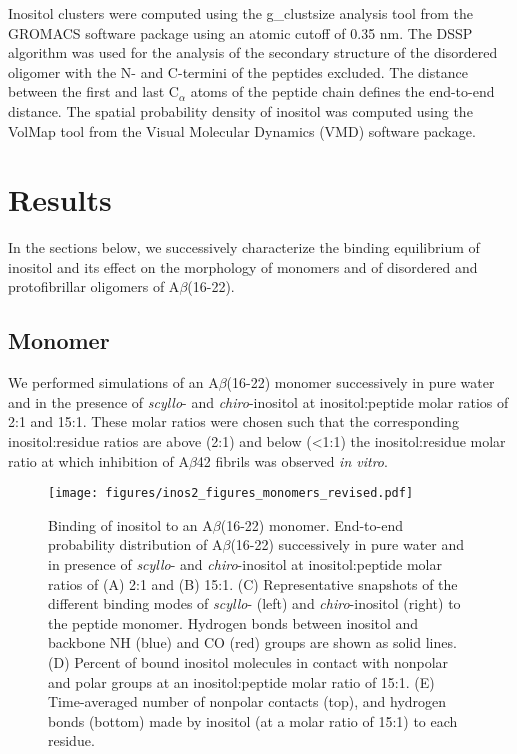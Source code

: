 Inositol clusters were computed using the g\_clustsize analysis tool from the GROMACS software package using an atomic cutoff of 0.35 nm. The DSSP algorithm was used for the analysis of the secondary structure of the disordered oligomer with the N- and C-termini of the peptides excluded. The distance between the first and last C$_{\alpha}$ atoms of the peptide chain defines the end-to-end distance. The spatial probability density of inositol was computed using the VolMap tool from the Visual Molecular Dynamics (VMD) software package.\cite{Humphrey:1996p850}

\section{Results}

In the sections below, we successively characterize the binding equilibrium of inositol and its effect on the morphology of monomers and of disordered and protofibrillar oligomers of A$\beta$(16-22).

\subsection{Monomer}

We performed simulations of an A$\beta$(16-22) monomer successively in pure water and in the presence of \emph{scyllo}- and \emph{chiro}-inositol at inositol:peptide molar ratios of 2:1 and 15:1.  These molar ratios were chosen such that the corresponding inositol:residue ratios are above (2:1) and below (<1:1) the inositol:residue molar ratio at which inhibition of A$\beta$42 fibrils was observed \emph{in vitro}.\cite{McLaurin:2000p64}

\begin{figure}
\texttt{[image: figures/inos2\_figures\_monomers\_revised.pdf]}
\caption{Binding of inositol to an A$\beta$(16-22) monomer.  End-to-end probability distribution of A$\beta$(16-22) successively in pure water and in presence of \emph{scyllo}- and \emph{chiro}-inositol at inositol:peptide molar ratios of (A) 2:1 and (B) 15:1.  (C) Representative snapshots of the different binding modes of \emph{scyllo}- (left) and \emph{chiro}-inositol (right)  to the peptide monomer. Hydrogen bonds between inositol and backbone NH (blue) and CO (red) groups are shown as solid lines. (D) Percent of bound inositol molecules in contact with nonpolar and polar groups at an inositol:peptide molar ratio of 15:1. (E) Time-averaged number of nonpolar contacts (top), and hydrogen bonds (bottom) made by inositol  (at a molar ratio of 15:1) to each residue.}
\label{fig:monomers}
\end{figure}

